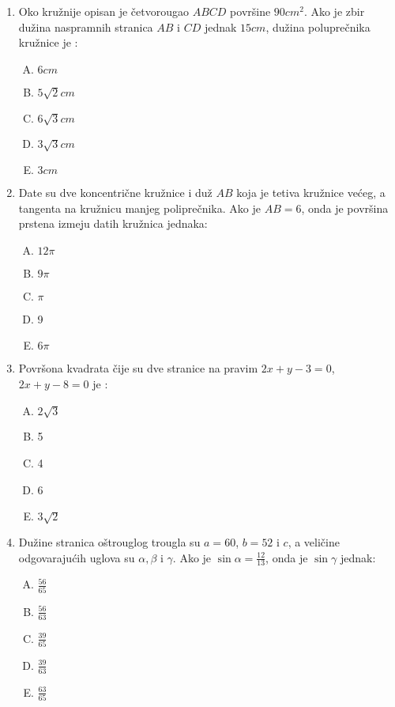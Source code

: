 \documentclass[a4paper,12pt]{report}
\begin{document}
\begin{enumerate}[1.]
\item Oko kru\v{z}nije opisan je \v{c}etvorougao $ABCD$ povr\v{s}ine $90cm^2$. Ako je zbir du\v{z}ina naspramnih stranica $AB$ i $CD$ jednak $15cm$, du\v{z}ina polupre\v{c}nika kru\v{z}nice je : 
\begin{multicols}{5}
\begin{enumerate}[A)]
\item $6cm$ \item $5\sqrt{2}cm$ \item $6\sqrt{3}cm$ \item $3\sqrt{3}cm$ \item $3cm$
\end{enumerate}
\end{multicols}

\item Date su dve koncentri\v{c}ne kru\v{z}nice i du\v{z} $AB$ koja je tetiva kru\v{z}nice ve\'{c}eg, a tangenta na kru\v{z}nicu manjeg polipre\v{c}nika. Ako je $AB = 6$, onda je povr\v{s}ina prstena izme\d{j}u datih kru\v{z}nica jednaka: 
\begin{multicols}{5}
\begin{enumerate}[A)]
\item $12\pi$  \item $9\pi$ \item $\pi$ \item 9 \item $6\pi$
\end{enumerate}
\end{multicols}

\item Povr\v{s}ona kvadrata \v{c}ije su dve stranice na pravim $2x + y - 3 = 0$, $2x +y -8 = 0$ je :
\begin{multicols}{5}
\begin{enumerate}[A)]
\item $2\sqrt{3}$  \item 5 \item 4 \item 6 \item $3\sqrt{2}$
\end{enumerate}
\end{multicols}

\item Du\v{z}ine stranica o\v{s}trouglog trougla su $a = 60$, $ b = 52$ i $c$, a veli\v{c}ine odgovaraju\'{c}ih uglova su $\alpha,\beta  $ i $\gamma $. Ako je $\sin{\alpha } = \frac{12}{13}$, onda je $\sin{\gamma }$ jednak:
\begin{multicols}{5}
\begin{enumerate}[A)]
\item $\frac{56}{65}$  \item $\frac{56}{63}$ \item $\frac{39}{65}$ \item $\frac{39}{63}$ \item $\frac{63}{65}$
\end{enumerate}
\end{multicols}

\end{enumerate}
\end{document}
